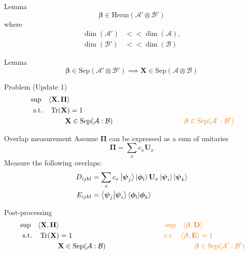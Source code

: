 \documentclass{beamer}
\newcommand{\betamat}{\boldsymbol\beta}
\newcommand{\psivec}{\boldsymbol\psi}
\newcommand{\phivec}{\boldsymbol\phi}
\newcommand{\observable}{\boldsymbol\Pi}
\newcommand{\Dmat}{\mathbf{D}}
\newcommand{\Emat}{\mathbf{E}}
\newcommand{\Umat}{\mathbf{U}}
\newcommand{\Xmat}{\mathbf{X}}
\newcommand{\A}{\mathcal{A}}
\newcommand{\B}{\mathcal{B}}
\newcommand{\Sep}{\mathrm{Sep}}
\newcommand{\Herm}{\mathrm{Herm}}
\newcommand{\st}{\mathrm{s.t.}}
\begin{document}
	\begin{frame}{Lemma}
		$$
			\betamat \in \Herm(\A' \otimes \B')
		$$
		where
		\begin{align*}
			\dim(\A') &<< \dim(\A), \\
			\dim(\B') &<< \dim(\B)
		\end{align*}
		\pause
		\begin{block}{Lemma}
			$$
				\betamat \in \Sep(\A' \otimes \B') \implies \Xmat \in \Sep(\A \otimes \B)
			$$
		\end{block}
	\end{frame}

	\begin{frame}{Problem (Update 1)}
		\begin{equation}
			\begin{aligned}
				& \sup \quad \langle \Xmat, \observable \rangle \nonumber \\
				& \hspace{5pt} \st \quad \Tr(\Xmat) = 1 \nonumber \\
				& \hspace{50pt} \Xmat \in \Sep(\A : \B) \hspace{100pt} \textcolor{orange}{\betamat \in \Sep(\A' : \B')} \nonumber
			\end{aligned}
		\end{equation}
	\end{frame}

	\begin{frame}{Overlap measurement}
		Assume $\observable$ can be expressed as a sum of unitaries
		$$
			\observable = \sum_x c_x \Umat_x
		$$
		Measure the following overlaps:
		\begin{align*}
			D_{ijkl} &= \sum_x c_x \ket{\psivec_j} \ket{\phivec_l} \Umat_x \ket{\psivec_i} \ket{\psivec_k} \\
			E_{ijkl} &= \braket{\psivec_j}{\psivec_i} \braket{\phivec_l}{\phivec_k}
		\end{align*}
	\end{frame}
        
	\begin{frame}{Post-processing}
		\begin{equation}
			\begin{aligned}
				& \sup \quad \langle \Xmat, \observable \rangle \hspace{150pt} \textcolor{orange}{\sup \quad \langle \betamat, \Dmat \rangle} \nonumber \\
				& \hspace{5pt} \st \quad \Tr(\Xmat) = 1 \hspace{130pt} \textcolor{orange}{\st \quad \langle \betamat, \Emat \rangle = 1} \nonumber \\
				& \hspace{55pt} \Xmat \in \Sep(\A : \B) \hspace{125pt} \textcolor{orange}{\betamat \in \Sep(\A' : \B')} \nonumber
			\end{aligned}
		\end{equation}
	\end{frame}
\end{document}
